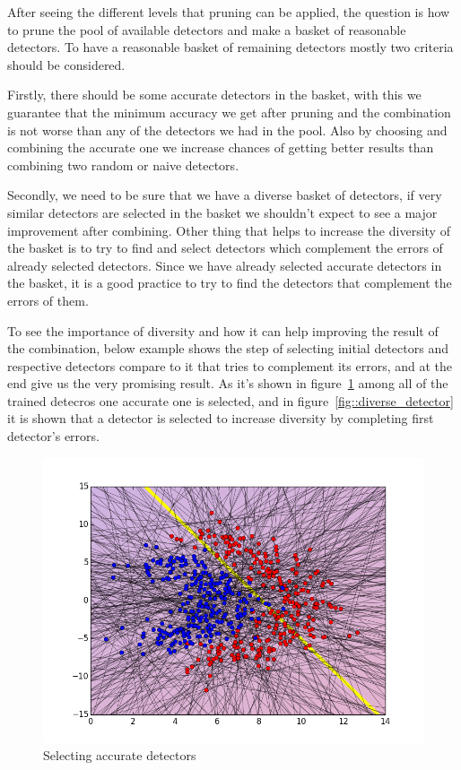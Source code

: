 After seeing the different levels that pruning can be applied, the question is how to prune the pool of available detectors and make a basket of reasonable detectors. To have a reasonable basket of remaining detectors mostly two criteria should be considered.  

Firstly, there should be some accurate detectors in the basket, with this we guarantee that the minimum accuracy we get after pruning and the combination is not worse than any of the detectors we had in the pool. Also by choosing and combining the accurate one we increase chances of getting better results than combining two random or naive detectors.  

Secondly, we need to be sure that we have a diverse basket of detectors, if very similar detectors  are selected  in the basket we shouldn't expect to see a major improvement after combining. Other thing that helps to increase the diversity of the basket is to try to find and select detectors which complement the errors of already selected detectors. Since we have already selected accurate detectors in the basket, it is a good practice to try to find the detectors that complement the errors of them. 

To see the importance of diversity and how it can help improving the result of the combination, below example shows the step of selecting initial detectors and respective detectors compare to it that tries to complement its errors, and at the end give us the very promising result. As it's shown in figure~\ref{fig::accurate_detector} among all of the trained detecros one accurate one is selected, and in figure~\ref{fig::diverse_detector} it is shown that a detector is selected to increase diversity by completing  first detector's errors.

\begin{figure}[H]
\centering
\includegraphics[width=1\linewidth]{figs/Lithuanian/Initial_detectors}
\caption{Selecting accurate detectors}
\label{fig::accurate_detector}
\end{figure}

